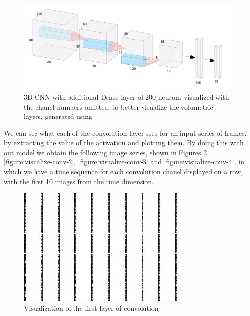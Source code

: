 \documentclass[12pt]{article}
\theoremstyle{definition}
\begin{document}
	\begin{figure}
		\includegraphics[width=\textwidth]{networks/3D-CNN-200-Dense.png}
		\caption{3D CNN with additional Dense layer of 200 neurons visualized with the chanel numbers omitted, to better visualize the volumetric layers, generated using \cite{nn-svg}}
		\label{figure:3D-CNN-200-Dense}
	\end{figure}

	We can see what each of the convolution layer sees for an input series of frames, by extracting the value of the activation and plotting them. By doing this with out model we obtain the following image series, shown in Figures \ref{figure:visualize-conv-1}, \ref{figure:visualize-conv-2}, \ref{figure:visualize-conv-3} and \ref{figure:visualize-conv-4}, in which we have a time sequence for each convolution chanel displayed on a row, with the first 10 images from the time dimension.

	\begin{figure}
		\includegraphics[width=\textwidth]{conv-see/visualization-2.jpg}
		\caption{Visualization of the first layer of convolution}
		\label{figure:visualize-conv-1}
	\end{figure}
\end{document}
